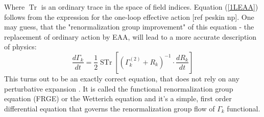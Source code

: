 \documentclass[11pt, a4paper]{article}
\begin{document}
Where $\operatorname{Tr}$ is an ordinary trace in the space of field indices.
Equation (\ref{1LEAA}) follows from the expression for the one-loop effective action [ref peskin np]. 
One may guess, that the "renormalization group improvement" of this equation - the replacement of ordinary action by
 EAA, will lead to a more accurate description of physics:
\begin{equation}
    \frac{d \Gamma_k}{dt} = \frac{1}{2} \operatorname{STr} \left[ \left(\Gamma_k^{(2)} + R_k\right)^{-1} \cdot \frac{d R_k}{dt} \right]
    \label{FRGE}
\end{equation}
This turns out to be an exactly correct equation, that does not rely on any perturbative expansion \cite{wetteq}.
It is called the functional renormalization group equation (FRGE) or the Wetterich equation and
it's a simple, first order differential equation that governs the renormalization group flow of $\Gamma_k$ functional.
\end{document}
